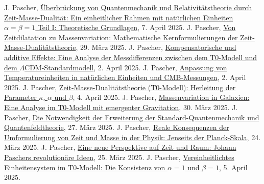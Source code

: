 \documentclass[12pt,a4paper]{article}
\begin{document}
	
	\begin{thebibliography}{99}
		 J. Pascher, \href{https://github.com/jpascher/T0-Time-Mass-Duality/tree/main/2/pdf/Deutsch/QMRelTimeMassPart1.pdf}{Überbrückung von Quantenmechanik und Relativitätstheorie durch Zeit-Masse-Dualität: Ein einheitlicher Rahmen mit natürlichen Einheiten \(\alpha = \beta = 1\) Teil I: Theoretische Grundlagen}, 7. April 2025.
		 J. Pascher, \href{https://github.com/jpascher/T0-Time-Mass-Duality/tree/main/2/pdf/Deutsch/MathZeitMasseLagrange.pdf}{Von Zeitdilatation zu Massenvariation: Mathematische Kernformulierungen der Zeit-Masse-Dualitätstheorie}, 29. März 2025.
		 J. Pascher, \href{https://github.com/jpascher/T0-Time-Mass-Duality/tree/main/2/pdf/Deutsch/MessdifferenzenT0Standard.pdf}{Kompensatorische und additive Effekte: Eine Analyse der Messdifferenzen zwischen dem T0-Modell und dem \(\Lambda\)CDM-Standardmodell}, 2. April 2025.
		 J. Pascher, \href{https://github.com/jpascher/T0-Time-Mass-Duality/tree/main/2/pdf/Deutsch/NatEinheitenAlpha1.pdf}{Anpassung von Temperatureinheiten in natürlichen Einheiten und CMB-Messungen}, 2. April 2025.
		 J. Pascher, \href{https://github.com/jpascher/T0-Time-Mass-Duality/tree/main/2/pdf/Deutsch/ZeitMasseT0Params.pdf}{Zeit-Masse-Dualitätstheorie (T0-Modell): Herleitung der Parameter \(\kappa\), \(\alpha\) und \(\beta\)}, 4. April 2025.
		 J. Pascher, \href{https://github.com/jpascher/T0-Time-Mass-Duality/tree/main/2/pdf/Deutsch/MassVarGalaxien.pdf}{Massenvariation in Galaxien: Eine Analyse im T0-Modell mit emergenter Gravitation}, 30. März 2025.
		 J. Pascher, \href{https://github.com/jpascher/T0-Time-Mass-Duality/tree/main/2/pdf/Deutsch/NotwendigkeitQMErweiterung.pdf}{Die Notwendigkeit der Erweiterung der Standard-Quantenmechanik und Quantenfeldtheorie}, 27. März 2025.
		 J. Pascher, \href{https://github.com/jpascher/T0-Time-Mass-Duality/tree/main/2/pdf/Deutsch/JenseitsPlanck.pdf}{Reale Konsequenzen der Umformulierung von Zeit und Masse in der Physik: Jenseits der Planck-Skala}, 24. März 2025.
		 J. Pascher, \href{https://github.com/jpascher/T0-Time-Mass-Duality/tree/main/2/pdf/Deutsch/ZeitRaumPascher.pdf}{Eine neue Perspektive auf Zeit und Raum: Johann Paschers revolutionäre Ideen}, 25. März 2025.
		 J. Pascher, \href{https://github.com/jpascher/T0-Time-Mass-Duality/tree/main/2/pdf/Deutsch/Alpha1Beta1Konsistenz.pdf}{Vereinheitlichtes Einheitensystem im T0-Modell: Die Konsistenz von \(\alpha = 1\) und \(\beta = 1\)}, 5. April 2025.

\end{thebibliography}
\end{document}
